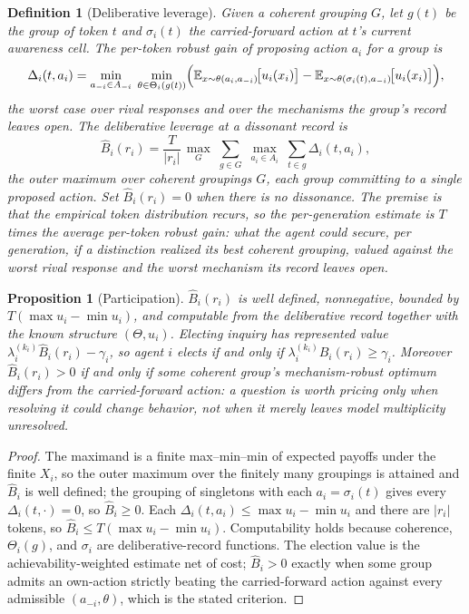 \documentclass[11pt]{article}
\newtheorem{definition}[assumption]{Definition}
\newtheorem{proposition}[assumption]{Proposition}
\theoremstyle{definition}
\begin{document}
\begin{definition}[Deliberative leverage]
\label{def:leverage}
Given a coherent grouping $G$, let $g(t)$ be the group of token $t$ and
$\sigma_i(t)$ the carried-forward action at $t$'s current awareness cell.  The
\emph{per-token robust gain} of proposing action $a_i$ for a group is
\[
\Delta_i(t,a_i)
=
\min_{a_{-i}\in A_{-i}}\;
\min_{\theta\in\Theta_i(g(t))}
\Bigl(
\mathbb E_{x\sim\theta(a_i,a_{-i})}\!\bigl[u_i(x_i)\bigr]
-
\mathbb E_{x\sim\theta(\sigma_i(t),a_{-i})}\!\bigl[u_i(x_i)\bigr]
\Bigr),
\]
the worst case over rival responses and over the mechanisms the group's record
leaves open.  The \emph{deliberative leverage} at a dissonant record is
\begin{equation}
\widehat B_i(r_i)
=
\frac{T}{\lvert r_i\rvert}\,
\max_{G}\;\sum_{g\in G}\;\max_{a_i\in A_i}\;\sum_{t\in g}\Delta_i(t,a_i),
\label{eq:leverage}
\end{equation}
the outer maximum over coherent groupings $G$, each group committing to a
single proposed action.  Set $\widehat B_i(r_i)=0$ when there is no dissonance.
The premise is that the empirical token \emph{distribution} recurs, so the
per-generation estimate is $T$ times the average per-token robust gain: what
the agent could secure, per generation, if a distinction realized its best
coherent grouping, valued against the worst rival response and the worst
mechanism its record leaves open.
\end{definition}

\begin{proposition}[Participation]
\label{prop:participation}
$\widehat B_i(r_i)$ is well defined, nonnegative, bounded by
$T(\max u_i-\min u_i)$, and computable from the deliberative record together
with the known structure $(\Theta,u_i)$.  Electing inquiry has represented
value $\lambda_i^{(k_i)}\widehat B_i(r_i)-\gamma_i$, so agent $i$ elects if and
only if $\lambda_i^{(k_i)}\widehat B_i(r_i)\geq\gamma_i$.  Moreover
$\widehat B_i(r_i)>0$ if and only if some coherent group's mechanism-robust
optimum differs from the carried-forward action: a question is worth pricing
only when resolving it could change behavior, not when it merely leaves model
multiplicity unresolved.
\end{proposition}

\begin{proof}
The maximand is a finite max--min--min of expected payoffs under the finite
$X_i$, so the outer maximum over the finitely many groupings is attained and
$\widehat B_i$ is well defined; the grouping of singletons with each
$a_i=\sigma_i(t)$ gives every $\Delta_i(t,\cdot)=0$, so $\widehat B_i\geq0$.
Each $\Delta_i(t,a_i)\leq\max u_i-\min u_i$ and there are $\lvert r_i\rvert$
tokens, so $\widehat B_i\leq T(\max u_i-\min u_i)$.  Computability holds
because coherence, $\Theta_i(g)$, and $\sigma_i$ are deliberative-record
functions.  The election value is the achievability-weighted estimate net of
cost; $\widehat B_i>0$ exactly when some group admits an own-action strictly
beating the carried-forward action against every admissible $(a_{-i},\theta)$,
which is the stated criterion.
\end{proof}
\end{document}
